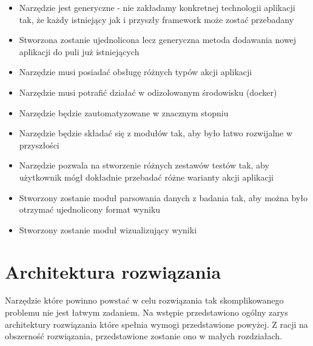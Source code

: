 \begin{itemize}
    \item Narzędzie jest generyczne - nie zakładamy konkretnej technologii aplikacji tak, że każdy istniejący jak i przyszły framework może zostać przebadany
    \item Stworzona zostanie ujednolicona lecz generyczna metoda dodawania nowej aplikacji do puli już istniejących
    \item Narzędzie musi posiadać obsługę różnych typów akcji aplikacji
    \item Narzędzie musi potrafić działać w odizolowanym środowisku (docker)
    \item Narzędzie będzie zautomatyzowane w znacznym stopniu
    \item Narzędzie będzie składać się z modułów tak, aby było łatwo rozwijalne w przyszłości
    \item Narzędzie pozwala na stworzenie różnych zestawów testów tak, aby użytkownik mógł dokładnie przebadać różne warianty akcji aplikacji
    \item Stworzony zostanie moduł parsowania danych z badania tak, aby można było otrzymać ujednolicony format wyniku
    \item Stworzony zostanie moduł wizualizujący wyniki
\end{itemize}

\section{Architektura rozwiązania}

Narzędzie które powinno powstać w celu rozwiązania tak skomplikowanego problemu nie jest łatwym zadaniem.
Na wstępie przedstawiono ogólny zarys architektury rozwiązania które spełnia wymogi przedstawione powyżej.
Z racji na obszerność rozwiązania, przedstawione zostanie ono w małych rozdziałach.

